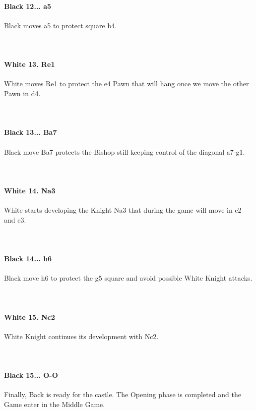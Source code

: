 \documentclass{article}
\begin{document}
\\
\textbf{Black 12... a5}\\
\\
Black moves a5 to protect square b4.\\
\\

\\
\\
\textbf{White 13. Re1}\\
\\
White moves Re1 to protect the e4 Pawn that will hang once we move the other Pawn in d4.\\
\\

\\
\\
\textbf{Black 13... Ba7}\\
\\
Black move Ba7 protects the Bishop still keeping control of the diagonal a7-g1.\\
\\

\\
\\
\textbf{White 14. Na3}\\
\\
White starts developing the Knight Na3 that during the game will move in c2 and e3.\\
\\

\\
\\
\textbf{Black 14... h6}\\
\\
Black move h6 to protect the g5 square and avoid possible White Knight attacks.\\
\\

\\
\\
\textbf{White 15. Nc2}\\
\\
White Knight continues its development with Nc2.\\
\\

\\
\\
\textbf{Black 15... O-O}\\
\\
Finally, Back is ready for the castle. The Opening phase is completed and the Game enter in the Middle Game.\\
\\
\end{document}

